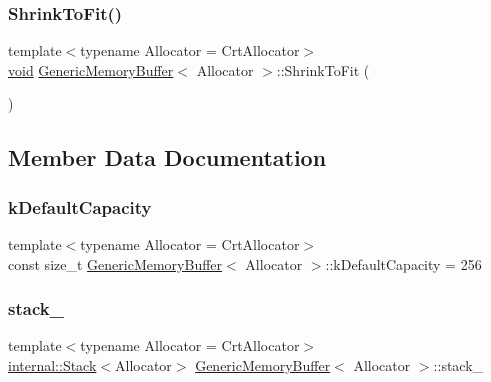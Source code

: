 \subsubsection{\texorpdfstring{Shrink\+To\+Fit()}{ShrinkToFit()}}
{\footnotesize\ttfamily template$<$typename Allocator  = Crt\+Allocator$>$ \\
\hyperlink{imgui__impl__opengl3__loader_8h_ac668e7cffd9e2e9cfee428b9b2f34fa7}{void} \hyperlink{structGenericMemoryBuffer}{Generic\+Memory\+Buffer}$<$ Allocator $>$\+::Shrink\+To\+Fit (\begin{DoxyParamCaption}{ }\end{DoxyParamCaption})\hspace{0.3cm}{\ttfamily [inline]}}



\subsection{Member Data Documentation}
\mbox{\label{structGenericMemoryBuffer_af6ecdbdbb8d3aa53cdef6e788e4980be}} 
\subsubsection{\texorpdfstring{k\+Default\+Capacity}{kDefaultCapacity}}
{\footnotesize\ttfamily template$<$typename Allocator  = Crt\+Allocator$>$ \\
const size\+\_\+t \hyperlink{structGenericMemoryBuffer}{Generic\+Memory\+Buffer}$<$ Allocator $>$\+::k\+Default\+Capacity = 256\hspace{0.3cm}{\ttfamily [static]}}

\mbox{\label{structGenericMemoryBuffer_a977b479180bebe8ae14ca1c11d52a486}} 
\subsubsection{\texorpdfstring{stack\+\_\+}{stack\_}}
{\footnotesize\ttfamily template$<$typename Allocator  = Crt\+Allocator$>$ \\
\hyperlink{classinternal_1_1Stack}{internal\+::\+Stack}$<$Allocator$>$ \hyperlink{structGenericMemoryBuffer}{Generic\+Memory\+Buffer}$<$ Allocator $>$\+::stack\+\_\+\hspace{0.3cm}{\ttfamily [mutable]}}



